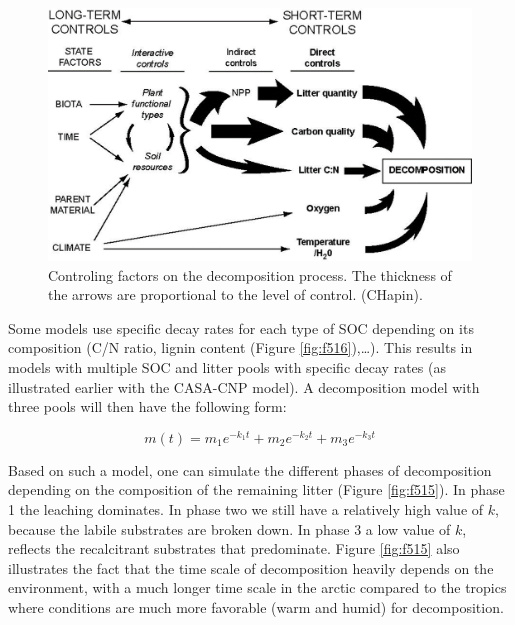 \documentclass[12pt,oneside]{book}
\begin{document}
\begin{figure}

{\centering \includegraphics[width=0.8\linewidth]{figures/chap5/f514_chapin_decomp_controls} 

}

\caption{Controling factors on the decomposition process. The thickness of the arrows are proportional to the level of control. (CHapin).}\label{fig:f514bis}
\end{figure}

Some models use specific decay rates for each type of SOC depending on
its composition (C/N ratio, lignin content (Figure
\ref{fig:f516}),\ldots{}). This results in models with multiple SOC and
litter pools with specific decay rates (as illustrated earlier with the
CASA-CNP model). A decomposition model with three pools will then have
the following form:

\[m(t) = m_1 e^{-k_1t} + m_2 e^{-k_2t} + m_3 e^{-k_3t} \]

Based on such a model, one can simulate the different phases of
decomposition depending on the composition of the remaining litter
(Figure \ref{fig:f515}). In phase 1 the leaching dominates. In phase two
we still have a relatively high value of \(k\), because the labile
substrates are broken down. In phase 3 a low value of \(k\), reflects
the recalcitrant substrates that predominate. Figure \ref{fig:f515} also
illustrates the fact that the time scale of decomposition heavily
depends on the environment, with a much longer time scale in the arctic
compared to the tropics where conditions are much more favorable (warm
and humid) for decomposition.
\end{document}
